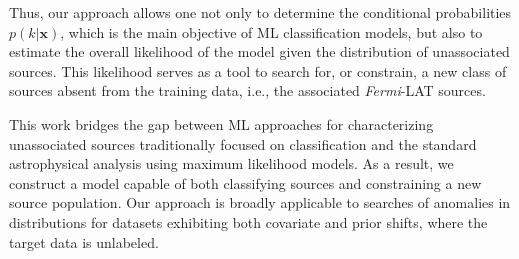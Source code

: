 \documentclass[12pt, a4paper]{article}
\newcommand{\Fermi}{{\textit{Fermi}}}
\begin{document}
Thus, our approach allows one not only to determine
the conditional probabilities $p(k|\mathbf{x})$, which is the main objective of ML classification models, but also to estimate the overall likelihood of the model given the distribution of unassociated sources. This likelihood serves as a tool to search for, or constrain, a new class of sources absent from the training data, i.e., the associated \Fermi-LAT sources.

This work bridges the gap between ML approaches for characterizing unassociated sources traditionally focused on classification and the standard astrophysical analysis using maximum likelihood models. As a result, we construct a model capable of both classifying sources and constraining a new source population. Our approach is broadly applicable to searches of anomalies in distributions for datasets exhibiting both covariate and prior shifts, where the target data is unlabeled.
\end{document}
